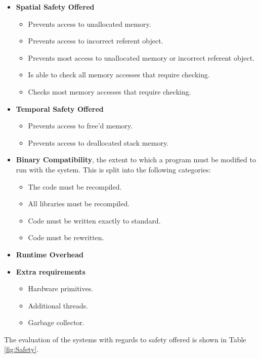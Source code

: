\begin{itemize}
    \item \textbf{Spatial Safety Offered}
    \begin{itemize}
        \item Prevents access to unallocated memory.
        \item Prevents access to incorrect referent object.
        \item Prevents most access to unallocated memory or incorrect referent object.
        \item Is able to check all memory accesses that require checking.
        \item Checks most memory accesses that require checking.
    \end{itemize}
    \item \textbf{Temporal Safety Offered}
    \begin{itemize}
        \item Prevents access to free'd memory.
        \item Prevents access to deallocated stack memory.
    \end{itemize}
    \item \textbf{Binary Compatibility}, the extent to which a program must be modified to run with the system. This is split into the following categories:
    \begin{itemize}
        \item The code must be recompiled.
        \item All libraries must be recompiled.
        \item Code must be written exactly to standard.
        \item Code must be rewritten.
    \end{itemize}
    \item \textbf{Runtime Overhead}
    \item \textbf{Extra requirements}
    \begin{itemize}
        \item Hardware primitives.
        \item Additional threads.
        \item Garbage collector.
    \end{itemize}
\end{itemize}

\newcommand*\rot{\rotatebox{90}}
\newcommand{\xmark}{\ding{55}}

The evaluation of the systems with regards to safety offered is shown in Table \ref{fig:Safety}.

